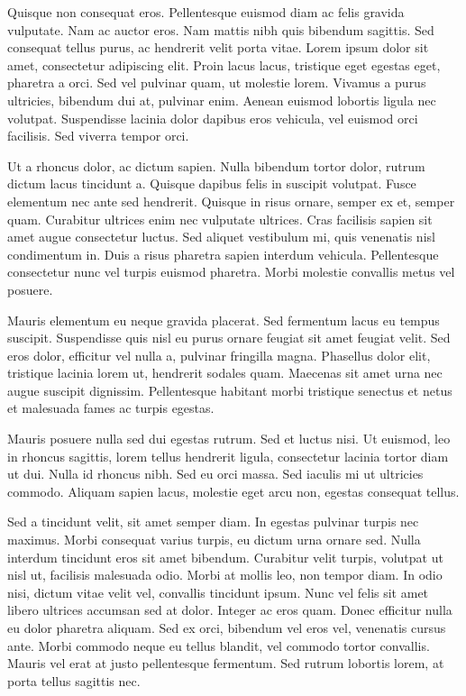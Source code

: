 Quisque non consequat eros. Pellentesque euismod diam ac felis gravida
vulputate. Nam ac auctor eros. Nam mattis nibh quis bibendum sagittis. Sed
consequat tellus purus, ac hendrerit velit porta vitae. Lorem ipsum dolor sit
amet, consectetur adipiscing elit. Proin lacus lacus, tristique eget egestas
eget, pharetra a orci. Sed vel pulvinar quam, ut molestie lorem. Vivamus a
purus ultricies, bibendum dui at, pulvinar enim. Aenean euismod lobortis ligula
nec volutpat. Suspendisse lacinia dolor dapibus eros vehicula, vel euismod orci
facilisis. Sed viverra tempor orci.

Ut a rhoncus dolor, ac dictum sapien. Nulla bibendum tortor dolor, rutrum
dictum lacus tincidunt a. Quisque dapibus felis in suscipit volutpat. Fusce
elementum nec ante sed hendrerit. Quisque in risus ornare, semper ex et, semper
quam. Curabitur ultrices enim nec vulputate ultrices. Cras facilisis sapien sit
amet augue consectetur luctus. Sed aliquet vestibulum mi, quis venenatis nisl
condimentum in. Duis a risus pharetra sapien interdum vehicula. Pellentesque
consectetur nunc vel turpis euismod pharetra. Morbi molestie convallis metus
vel posuere.

Mauris elementum eu neque gravida placerat. Sed fermentum lacus eu tempus
suscipit. Suspendisse quis nisl eu purus ornare feugiat sit amet feugiat velit.
Sed eros dolor, efficitur vel nulla a, pulvinar fringilla magna. Phasellus
dolor elit, tristique lacinia lorem ut, hendrerit sodales quam. Maecenas sit
amet urna nec augue suscipit dignissim. Pellentesque habitant morbi tristique
senectus et netus et malesuada fames ac turpis egestas.

Mauris posuere nulla sed dui egestas rutrum. Sed et luctus nisi. Ut euismod,
leo in rhoncus sagittis, lorem tellus hendrerit ligula, consectetur lacinia
tortor diam ut dui. Nulla id rhoncus nibh. Sed eu orci massa. Sed iaculis mi ut
ultricies commodo. Aliquam sapien lacus, molestie eget arcu non, egestas
consequat tellus.

Sed a tincidunt velit, sit amet semper diam. In egestas pulvinar turpis nec
maximus. Morbi consequat varius turpis, eu dictum urna ornare sed. Nulla
interdum tincidunt eros sit amet bibendum. Curabitur velit turpis, volutpat ut
nisl ut, facilisis malesuada odio. Morbi at mollis leo, non tempor diam. In
odio nisi, dictum vitae velit vel, convallis tincidunt ipsum. Nunc vel felis
sit amet libero ultrices accumsan sed at dolor. Integer ac eros quam. Donec
efficitur nulla eu dolor pharetra aliquam. Sed ex orci, bibendum vel eros vel,
venenatis cursus ante. Morbi commodo neque eu tellus blandit, vel commodo
tortor convallis. Mauris vel erat at justo pellentesque fermentum. Sed rutrum
lobortis lorem, at porta tellus sagittis nec.

